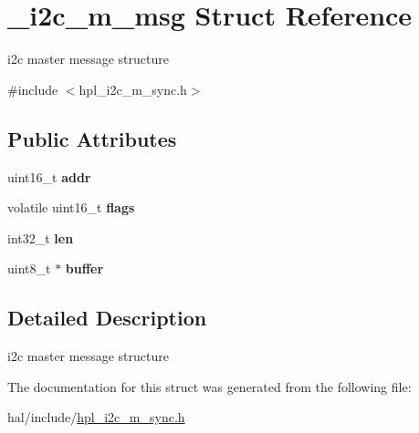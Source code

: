 \hypertarget{struct__i2c__m__msg}{}\section{\+\_\+i2c\+\_\+m\+\_\+msg Struct Reference}
\label{struct__i2c__m__msg}


i2c master message structure  




{\ttfamily \#include $<$hpl\+\_\+i2c\+\_\+m\+\_\+sync.\+h$>$}

\subsection*{Public Attributes}
\begin{DoxyCompactItemize}
\item 
\mbox{\label{struct__i2c__m__msg_a0e1a1068f55f090d0db5163c927d5f04}} 
uint16\+\_\+t {\bfseries addr}
\item 
\mbox{\label{struct__i2c__m__msg_a9348c9a7f89e4c67ad2015a6a7af4acd}} 
volatile uint16\+\_\+t {\bfseries flags}
\item 
\mbox{\label{struct__i2c__m__msg_add3fa18732c30f10efe7370a1934b2b6}} 
int32\+\_\+t {\bfseries len}
\item 
\mbox{\label{struct__i2c__m__msg_a328a30ad1bc85a893c14200300d695b9}} 
uint8\+\_\+t $\ast$ {\bfseries buffer}
\end{DoxyCompactItemize}


\subsection{Detailed Description}
i2c master message structure 

The documentation for this struct was generated from the following file\+:\begin{DoxyCompactItemize}
\item 
hal/include/\hyperlink{hpl__i2c__m__sync_8h}{hpl\+\_\+i2c\+\_\+m\+\_\+sync.\+h}\end{DoxyCompactItemize}
